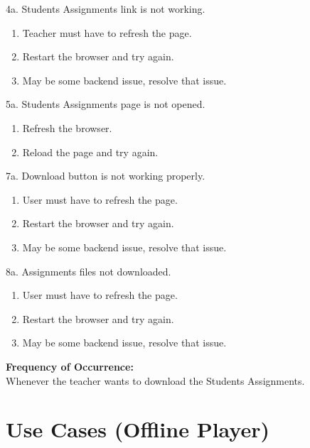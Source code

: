 4a. Students Assignments link is not working.
\begin{enumerate}
\item Teacher must have to refresh the page.
\item Restart the browser and try again.
\item May be some backend issue, resolve that issue.
\end{enumerate}
5a. Students Assignments page is not opened.
\begin{enumerate}
\item Refresh the browser.
\item Reload the page and try again.
\end{enumerate}
7a. Download button is not working properly.
\begin{enumerate}
\item User must have to refresh the page.
\item Restart the browser and try again.
\item May be some backend issue, resolve that issue.
\end{enumerate}
8a. Assignments files not downloaded.
\begin{enumerate}
\item User must have to refresh the page.
\item Restart the browser and try again.
\item May be some backend issue, resolve that issue.
\end{enumerate}
\textbf{Frequency of Occurrence:}\\
Whenever the teacher wants to download the Students Assignments.


\section{Use Cases (Offline Player)}
